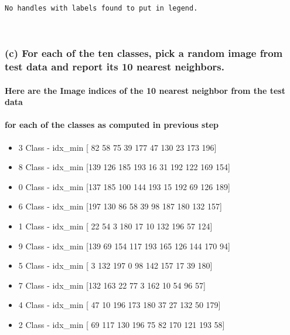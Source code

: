 \documentclass[11pt]{article}
\providecommand{\tightlist}{%
      \setlength{\itemsep}{0pt}\setlength{\parskip}{0pt}}
\begin{document}
    \begin{Verbatim}[commandchars=\\\{\}]
No handles with labels found to put in legend.

    \end{Verbatim}

    \begin{center}
    \end{center}
    { \hspace*{\fill} \\}
    
    \subsubsection{(c) For each of the ten classes, pick a random image from
test data and report its 10 nearest
neighbors.}\label{c-for-each-of-the-ten-classes-pick-a-random-image-from-test-data-and-report-its-10-nearest-neighbors.}

\paragraph{Here are the Image indices of the 10 nearest neighbor from
the test
data}\label{here-are-the-image-indices-of-the-10-nearest-neighbor-from-the-test-data}

\paragraph{for each of the classes as computed in previous
step}\label{for-each-of-the-classes-as-computed-in-previous-step}

\begin{itemize}
\tightlist
\item
  3 Class - idx\_min {[} 82 58 75 39 177 47 130 23 173 196{]}
\item
  8 Class - idx\_min {[}139 126 185 193 16 31 192 122 169 154{]}
\item
  0 Class - idx\_min {[}137 185 100 144 193 15 192 69 126 189{]}
\item
  6 Class - idx\_min {[}197 130 86 58 39 98 187 180 132 157{]}
\item
  1 Class - idx\_min {[} 22 54 3 180 17 10 132 196 57 124{]}
\item
  9 Class - idx\_min {[}139 69 154 117 193 165 126 144 170 94{]}
\item
  5 Class - idx\_min {[} 3 132 197 0 98 142 157 17 39 180{]}
\item
  7 Class - idx\_min {[}132 163 22 77 3 162 10 54 96 57{]}
\item
  4 Class - idx\_min {[} 47 10 196 173 180 37 27 132 50 179{]}
\item
  2 Class - idx\_min {[} 69 117 130 196 75 82 170 121 193 58{]}
\end{itemize}


    
    
    
    
\end{document}
